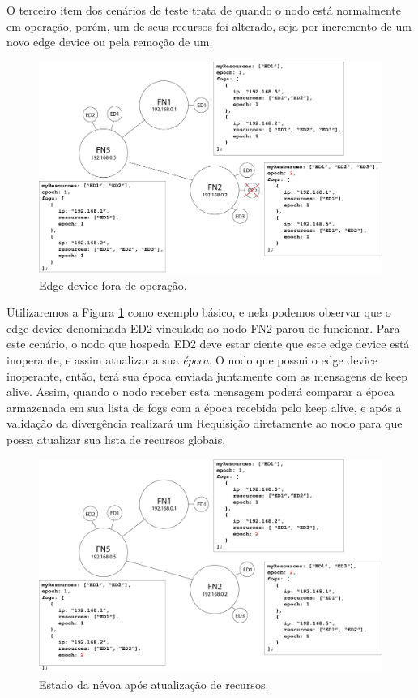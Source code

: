 O terceiro item dos cenários de teste trata de quando o nodo está normalmente em operação, porém, um de seus recursos foi alterado, seja por incremento de um novo edge device ou
pela remoção de um.

\begin{figure}[H]
    \centering\includegraphics[width=.8\textwidth]{fig10.png} 
    \caption[Edge device fora de operação]
    {\label{fig:fig10} Edge device fora de operação.}
\end{figure}

Utilizaremos a Figura \ref{fig:fig10} como exemplo básico, e nela podemos observar que o edge device denominada ED2 vinculado ao nodo FN2 parou de funcionar.
Para este cenário, o nodo que hospeda ED2 deve estar ciente que este edge device está inoperante, e assim atualizar a sua \textit{época}.
O nodo que possui o edge device inoperante, então, terá sua época enviada juntamente com as mensagens de keep alive.
Assim, quando o nodo receber esta mensagem poderá comparar a época armazenada em sua lista de fogs com a época recebida pelo keep alive, e após a validação da divergência realizará
um Requisição diretamente ao nodo para que possa atualizar sua lista de recursos globais.

\begin{figure}[H]
    \centering\includegraphics[width=.8\textwidth]{fig11.png} 
    \caption[Estado da névoa após atualização de recursos]
    {\label{fig:fig11} Estado da névoa após atualização de recursos.}
\end{figure}


